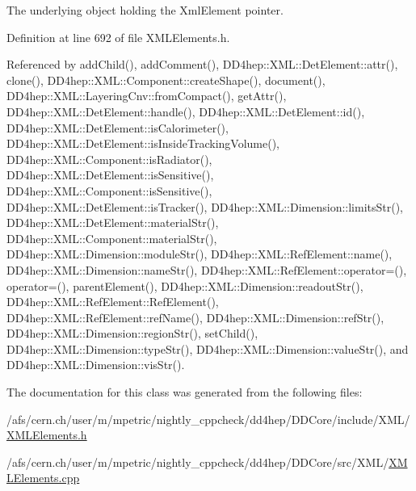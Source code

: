 The underlying object holding the XmlElement pointer. 

Definition at line 692 of file XMLElements.h.

Referenced by addChild(), addComment(), DD4hep::XML::DetElement::attr(), clone(), DD4hep::XML::Component::createShape(), document(), DD4hep::XML::LayeringCnv::fromCompact(), getAttr(), DD4hep::XML::DetElement::handle(), DD4hep::XML::DetElement::id(), DD4hep::XML::DetElement::isCalorimeter(), DD4hep::XML::DetElement::isInsideTrackingVolume(), DD4hep::XML::Component::isRadiator(), DD4hep::XML::DetElement::isSensitive(), DD4hep::XML::Component::isSensitive(), DD4hep::XML::DetElement::isTracker(), DD4hep::XML::Dimension::limitsStr(), DD4hep::XML::DetElement::materialStr(), DD4hep::XML::Component::materialStr(), DD4hep::XML::Dimension::moduleStr(), DD4hep::XML::RefElement::name(), DD4hep::XML::Dimension::nameStr(), DD4hep::XML::RefElement::operator=(), operator=(), parentElement(), DD4hep::XML::Dimension::readoutStr(), DD4hep::XML::RefElement::RefElement(), DD4hep::XML::RefElement::refName(), DD4hep::XML::Dimension::refStr(), DD4hep::XML::Dimension::regionStr(), setChild(), DD4hep::XML::Dimension::typeStr(), DD4hep::XML::Dimension::valueStr(), and DD4hep::XML::Dimension::visStr().

The documentation for this class was generated from the following files:\begin{DoxyCompactItemize}
\item 
/afs/cern.ch/user/m/mpetric/nightly\_\-cppcheck/dd4hep/DDCore/include/XML/\hyperlink{_x_m_l_elements_8h}{XMLElements.h}\item 
/afs/cern.ch/user/m/mpetric/nightly\_\-cppcheck/dd4hep/DDCore/src/XML/\hyperlink{_x_m_l_elements_8cpp}{XMLElements.cpp}\end{DoxyCompactItemize}
